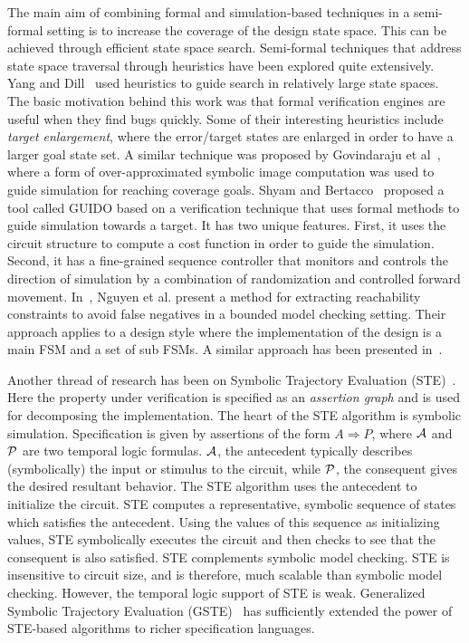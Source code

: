 \noindent
The main aim of combining formal and simulation-based techniques in 
a semi-formal setting is to increase the coverage 
of the design state space. This can be achieved through efficient 
state space search. Semi-formal techniques that address state 
space traversal through heuristics have been explored quite extensively. 
Yang and Dill~\cite{yang} used heuristics to guide search in relatively 
large state spaces. The basic motivation behind this work was that 
formal verification engines are useful when they find bugs quickly. 
Some of their interesting heuristics include {\em target enlargement}, 
where the error/target states are enlarged in order to have a larger 
goal state set. A similar technique was proposed by 
Govindaraju et al~\cite{govindaraju:98}, where a form of over-approximated 
symbolic image computation was used to guide simulation for reaching 
coverage goals. Shyam and Bertacco~\cite{guido}
proposed a tool called GUIDO based on a verification technique that uses 
formal methods to guide simulation towards a target. It has two unique 
features. First, it uses the circuit structure to compute a cost 
function in order to guide the simulation. Second, it has a fine-grained 
sequence controller that monitors and controls the direction of simulation 
by a combination of randomization and controlled forward movement. 
In~\cite{kunz}, Nguyen et al. present a method for extracting
reachability constraints to avoid false negatives in a bounded 
model checking setting. Their approach applies to a design style
where the implementation of the design is a main FSM and a set of
sub FSMs. A similar approach has been presented in~\cite{cho}.

\noindent
Another thread of research has been on Symbolic Trajectory
Evaluation (STE)~\cite{gste1}. Here the property under verification is
specified as an {\em assertion graph} and is used for decomposing the
implementation. The heart of the STE algorithm is symbolic simulation. 
Specification is given by assertions of the form $A \Rightarrow P$, 
where ${\cal A}$ and ${\cal P}$ are two temporal logic formulas. ${\cal A}$, 
the antecedent typically describes (symbolically) the input or stimulus 
to the circuit, while ${\cal P}$, the consequent gives the desired 
resultant behavior. The STE algorithm uses the antecedent to initialize the 
circuit. STE computes a representative, symbolic sequence of states which 
satisfies the antecedent. Using the values of this sequence as initializing 
values, STE symbolically executes the circuit and then checks to see that 
the consequent is also satisfied. STE complements symbolic model checking. 
STE is insensitive to circuit size, and is therefore, much scalable 
than symbolic model checking. However, the temporal logic support of 
STE is weak. Generalized Symbolic Trajectory Evaluation 
(GSTE)~\cite{gste1} has sufficiently extended the power of STE-based 
algorithms to richer specification languages. 

